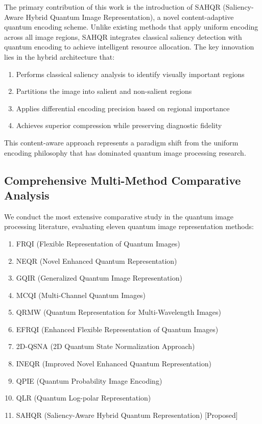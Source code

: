 \documentclass[pdflatex,sn-mathphys-num,Numbered]{sn-jnl}
\theoremstyle{thmstyleone}
\theoremstyle{thmstyletwo}
\theoremstyle{thmstylethree}
\begin{document}
The primary contribution of this work is the introduction of SAHQR (Saliency-Aware Hybrid Quantum Image Representation), a novel content-adaptive quantum encoding scheme. Unlike existing methods that apply uniform encoding across all image regions, SAHQR integrates classical saliency detection with quantum encoding to achieve intelligent resource allocation. The key innovation lies in the hybrid architecture that:

\begin{enumerate}
\item Performs classical saliency analysis to identify visually important regions
\item Partitions the image into salient and non-salient regions
\item Applies differential encoding precision based on regional importance
\item Achieves superior compression while preserving diagnostic fidelity
\end{enumerate}

This content-aware approach represents a paradigm shift from the uniform encoding philosophy that has dominated quantum image processing research.

\subsection{Comprehensive Multi-Method Comparative Analysis}

We conduct the most extensive comparative study in the quantum image processing literature, evaluating eleven quantum image representation methods:

\begin{enumerate}
\item FRQI (Flexible Representation of Quantum Images) \cite{bib18}
\item NEQR (Novel Enhanced Quantum Representation) \cite{bib19}
\item GQIR (Generalized Quantum Image Representation) \cite{bib46,bib15}
\item MCQI (Multi-Channel Quantum Images) \cite{bib47,bib13}
\item QRMW (Quantum Representation for Multi-Wavelength Images) \cite{bib48,bib49}
\item EFRQI (Enhanced Flexible Representation of Quantum Images) \cite{bib50,bib51}
\item 2D-QSNA (2D Quantum State Normalization Approach) \cite{bib52,bib53}
\item INEQR (Improved Novel Enhanced Quantum Representation) \cite{bib54,bib55}
\item QPIE (Quantum Probability Image Encoding) \cite{bib56,bib57}
\item QLR (Quantum Log-polar Representation) \cite{bib58,bib49}
\item SAHQR (Saliency-Aware Hybrid Quantum Representation) [Proposed]
\end{enumerate}
\end{document}
